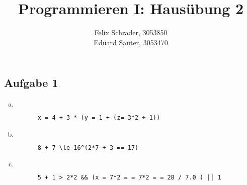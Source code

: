 \documentclass[11pt]{article}
\author{Felix Schrader, 3053850 \\
      Eduard Sauter, 3053470 }
\title{Programmieren I: Haus\"ubung 2}
\begin{document}
\maketitle
\subsection*{Aufgabe 1}
\begin{enumerate}[a)]
  \item $ $ %
    \begin{lstlisting}
      x = 4 + 3 * (y = 1 + (z= 3*2 + 1))
    \end{lstlisting}
  \item $ $
    \begin{lstlisting}
      8 + 7 \le 16^(2*7 + 3 == 17)
    \end{lstlisting}
  \item $ $
    \begin{lstlisting}
      5 + 1 > 2*2 && (x = 7*2 = = 7*2 = = 28 / 7.0 ) || 1
    \end{lstlisting}
  
  
\end{enumerate} 
\end{document}
